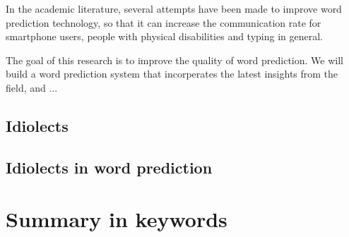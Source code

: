 \documentclass[12pt]{article}
\begin{document}
In the academic literature, several attempts have been made to improve word prediction technology, so that it can increase the communication rate for smartphone users, people with physical disabilities and typing in general. 


The goal of this research is to improve the quality of word prediction. We will build a word prediction system that incorperates the latest insights from the field, and ...



\subsection{Idiolects} \label{idiolects}


\subsection{Idiolects in word prediction} \label{link}


\section{Summary in keywords}
\end{document}
